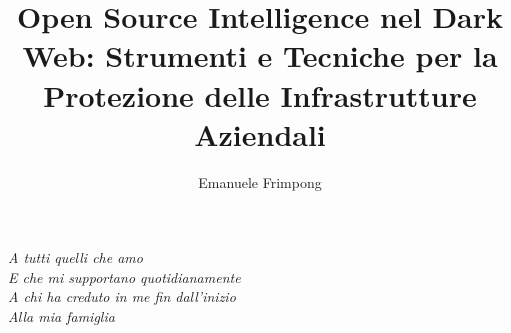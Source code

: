 \documentclass{theme/uniprthesis}
\title{Open Source Intelligence nel Dark Web: Strumenti e Tecniche per la Protezione delle Infrastrutture Aziendali}
\author{Emanuele Frimpong}
\begin{document}
\maketitle

\cleardoublepage

\newpage
\thispagestyle{empty}
\null{}
\begin{flushright}
	\textit{A tutti quelli che amo\\
    E che mi supportano quotidianamente\\
    A chi ha creduto in me fin dall'inizio\\
    Alla mia famiglia}
\end{flushright}
\null
\newpage
%
\newpage 

\thispagestyle{empty}
\ %

\newpage
\pagestyle{plain}
\tableofcontents
%
\listoffigures    %
%
%
%

%
\pagestyle{fancy}
%






%
%
\pagestyle{plain}

%
\cleardoublepage
{}

%

%
%
%
\end{document}
